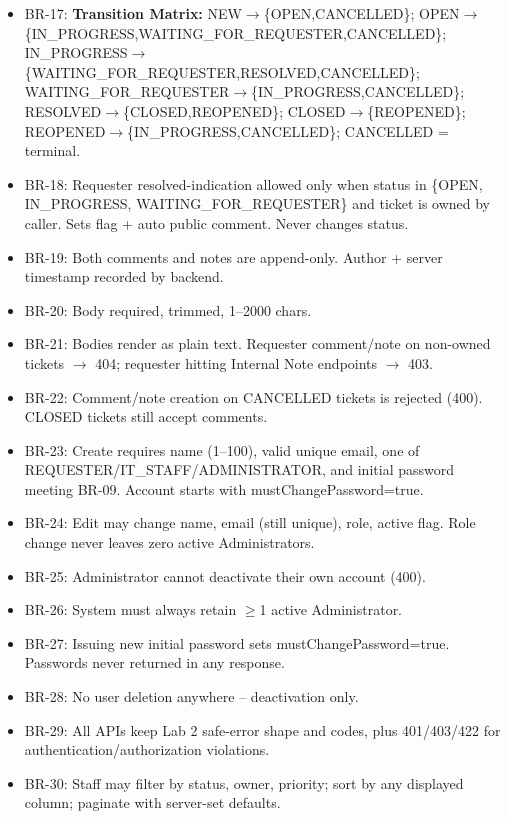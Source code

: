 \documentclass[11pt,a4paper]{article}
\begin{document}
\begin{itemize}
\item BR-17: \textbf{Transition Matrix:} NEW$\to$\{OPEN,CANCELLED\}; OPEN$\to$\{IN\_PROGRESS,WAITING\_FOR\_REQUESTER,CANCELLED\}; IN\_PROGRESS$\to$\{WAITING\_FOR\_REQUESTER,RESOLVED,CANCELLED\}; WAITING\_FOR\_REQUESTER$\to$\{IN\_PROGRESS,CANCELLED\}; RESOLVED$\to$\{CLOSED,REOPENED\}; CLOSED$\to$\{REOPENED\}; REOPENED$\to$\{IN\_PROGRESS,CANCELLED\}; CANCELLED = terminal.
\item BR-18: Requester resolved-indication allowed only when status in \{OPEN, IN\_PROGRESS, WAITING\_FOR\_REQUESTER\} and ticket is owned by caller. Sets flag + auto public comment. Never changes status.
\item BR-19: Both comments and notes are append-only. Author + server timestamp recorded by backend.
\item BR-20: Body required, trimmed, 1--2000 chars.
\item BR-21: Bodies render as plain text. Requester comment/note on non-owned tickets $\to$ 404; requester hitting Internal Note endpoints $\to$ 403.
\item BR-22: Comment/note creation on CANCELLED tickets is rejected (400). CLOSED tickets still accept comments.
\item BR-23: Create requires name (1--100), valid unique email, one of REQUESTER/IT\_STAFF/ADMINISTRATOR, and initial password meeting BR-09. Account starts with mustChangePassword=true.
\item BR-24: Edit may change name, email (still unique), role, active flag. Role change never leaves zero active Administrators.
\item BR-25: Administrator cannot deactivate their own account (400).
\item BR-26: System must always retain $\ge$1 active Administrator.
\item BR-27: Issuing new initial password sets mustChangePassword=true. Passwords never returned in any response.
\item BR-28: No user deletion anywhere -- deactivation only.
\item BR-29: All APIs keep Lab 2 safe-error shape and codes, plus 401/403/422 for authentication/authorization violations.
\item BR-30: Staff may filter by status, owner, priority; sort by any displayed column; paginate with server-set defaults.
\end{itemize}
\end{document}
